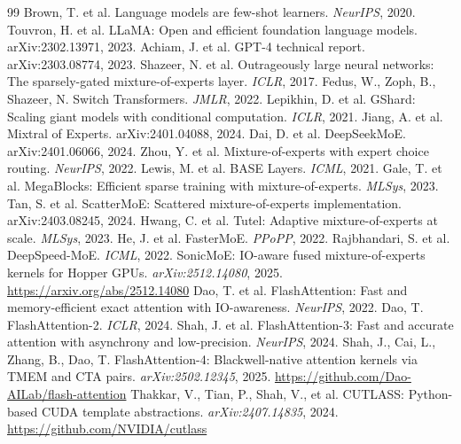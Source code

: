 \documentclass[10pt]{article}
\begin{document}

\begin{thebibliography}{99}
 Brown, T. et al. Language models are few-shot learners. \emph{NeurIPS}, 2020.
 Touvron, H. et al. LLaMA: Open and efficient foundation language models. arXiv:2302.13971, 2023.
 Achiam, J. et al. GPT-4 technical report. arXiv:2303.08774, 2023.
 Shazeer, N. et al. Outrageously large neural networks: The sparsely-gated mixture-of-experts layer. \emph{ICLR}, 2017.
 Fedus, W., Zoph, B., Shazeer, N. Switch Transformers. \emph{JMLR}, 2022.
 Lepikhin, D. et al. GShard: Scaling giant models with conditional computation. \emph{ICLR}, 2021.
 Jiang, A. et al. Mixtral of Experts. arXiv:2401.04088, 2024.
 Dai, D. et al. DeepSeekMoE. arXiv:2401.06066, 2024.
 Zhou, Y. et al. Mixture-of-experts with expert choice routing. \emph{NeurIPS}, 2022.
 Lewis, M. et al. BASE Layers. \emph{ICML}, 2021.
 Gale, T. et al. MegaBlocks: Efficient sparse training with mixture-of-experts. \emph{MLSys}, 2023.
 Tan, S. et al. ScatterMoE: Scattered mixture-of-experts implementation. arXiv:2403.08245, 2024.
 Hwang, C. et al. Tutel: Adaptive mixture-of-experts at scale. \emph{MLSys}, 2023.
 He, J. et al. FasterMoE. \emph{PPoPP}, 2022.
 Rajbhandari, S. et al. DeepSpeed-MoE. \emph{ICML}, 2022.
 SonicMoE: IO-aware fused mixture-of-experts kernels for Hopper GPUs. \emph{arXiv:2512.14080}, 2025. \url{https://arxiv.org/abs/2512.14080}
 Dao, T. et al. FlashAttention: Fast and memory-efficient exact attention with IO-awareness. \emph{NeurIPS}, 2022.
 Dao, T. FlashAttention-2. \emph{ICLR}, 2024.
 Shah, J. et al. FlashAttention-3: Fast and accurate attention with asynchrony and low-precision. \emph{NeurIPS}, 2024.
 Shah, J., Cai, L., Zhang, B., Dao, T. FlashAttention-4: Blackwell-native attention kernels via TMEM and CTA pairs. \emph{arXiv:2502.12345}, 2025. \url{https://github.com/Dao-AILab/flash-attention}
 Thakkar, V., Tian, P., Shah, V., et al. CUTLASS: Python-based CUDA template abstractions. \emph{arXiv:2407.14835}, 2024. \url{https://github.com/NVIDIA/cutlass}

\end{thebibliography}
\end{document}
